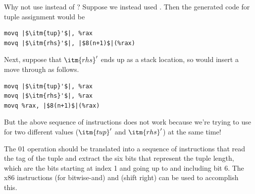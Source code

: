 \documentclass[7x10,nocrop]{TimesAPriori_MIT}%
\def\racketEd{0}
\def\pythonEd{1}
\def\edition{1}
\newcommand{\racket}[1]{{\if\edition\racketEd{#1}\fi}}
\newcommand{\python}[1]{{\if\edition\pythonEd #1\fi}}
\begin{document}
Why not use  instead of ? Suppose we instead used
. Then the generated code for tuple assignment would be
\begin{lstlisting}
movq |$\itm{tup}'$|, %rax
movq |$\itm{rhs}'$|, |$8(n+1)$|(%rax)
\end{lstlisting}
Next, suppose that $\itm{rhs}'$ ends up as a stack location, so
 would insert a move through 
as follows.
\begin{lstlisting}
movq |$\itm{tup}'$|, %rax
movq |$\itm{rhs}'$|, %rax
movq %rax, |$8(n+1)$|(%rax)
\end{lstlisting}
But the above sequence of instructions does not work because we're
trying to use  for two different values ($\itm{tup}'$ and
$\itm{rhs}'$) at the same time!

The \racket{}\python{} operation should
be translated into a sequence of instructions that read the tag of the
tuple and extract the six bits that represent the tuple length, which
are the bits starting at index 1 and going up to and including bit 6.
The x86 instructions  (for bitwise-and) and 
(shift right) can be used to accomplish this.
\end{document}
